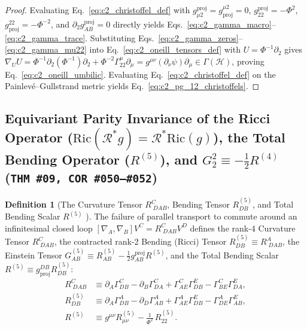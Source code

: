 \documentclass[11pt,a4paper]{article}
\newcommand{\catD}{\text{\textbf{\textcolor{blue!75!black}{[D]}}}}
\theoremstyle{definition}
\newtheorem{definition}[axiom]{Definition}
\theoremstyle{plain}
\theoremstyle{remark}
\begin{document}
\begin{proof}
Evaluating Eq.~\eqref{eq:c2_christoffel_def} with $g_{\mu 2}^{\mathrm{proj}} = g^{\mu 2}_{\mathrm{proj}} = 0$, $g_{22}^{\mathrm{proj}} = -\Phi^2$, $g^{22}_{\mathrm{proj}} = -\Phi^{-2}$, and $\partial_2 g_{AB}^{\mathrm{proj}} = 0$ directly yields Eqs.~\eqref{eq:c2_gamma_macro}--\eqref{eq:c2_gamma_trace}. Substituting Eqs.~\eqref{eq:c2_gamma_zeros}--\eqref{eq:c2_gamma_mu22} into Eq.~\eqref{eq:c2_oneill_tensors_def} with $U = \Phi^{-1}\partial_2$ gives $\nabla_U U = \Phi^{-1}\partial_2(\Phi^{-1})\partial_2 + \Phi^{-2}\Gamma^\mu_{22}\partial_\mu = g^{\mu\nu}(\partial_\nu\psi)\partial_\mu \in \Gamma(\mathcal{H})$, proving Eq.~\eqref{eq:c2_oneill_umbilic}. Evaluating Eq.~\eqref{eq:c2_christoffel_def} on the Painlev\'e--Gullstrand metric yields Eq.~\eqref{eq:c2_pg_12_christoffels}.
\end{proof}

\subsection{\texorpdfstring{Equivariant Parity Invariance of the Ricci Operator ($\mathrm{Ric}(\mathcal{R}^* g) = \mathcal{R}^*\mathrm{Ric}(g)$), the Total Bending Operator ($R^{(5)}$), and $G^2_2 \equiv -\frac{1}{2}R^{(4)}$ (\texttt{THM~\#09, COR~\#050--\#052})}{Equivariant Parity Invariance of the Ricci Operator, the Total Bending Operator, and G\^2\_2 = -(1/2)R\^(4)}}

\begin{definition}[The Curvature Tensor $R^C_{\;DAB}$, Bending Tensor $R_{DB}^{(5)}$, and Total Bending Scalar $R^{(5)}$ \catD]\label{def:c2_total_bending}
The failure of parallel transport to commute around an infinitesimal closed loop $[\nabla_A, \nabla_B]V^C = R^C_{\;DAB}V^D$ defines the rank-4 Curvature Tensor $R^C_{\;DAB}$, the contracted rank-2 Bending (Ricci) Tensor $R_{DB}^{(5)} \equiv R^A_{\;DAB}$, the Einstein Tensor $G_{AB}^{(5)} \equiv R_{AB}^{(5)} - \frac{1}{2}g_{AB}^{\mathrm{proj}}R^{(5)}$, and the Total Bending Scalar $R^{(5)} \equiv g^{DB}_{\mathrm{proj}}R_{DB}^{(5)}$:
\begin{align}
R^C_{\;DAB} &\equiv \partial_A \Gamma^C_{DB} - \partial_B \Gamma^C_{DA} + \Gamma^C_{AE}\Gamma^E_{DB} - \Gamma^C_{BE}\Gamma^E_{DA}, \label{eq:c2_riemann_def} \\[3pt]
R_{DB}^{(5)} &\equiv \partial_A \Gamma^A_{DB} - \partial_D \Gamma^A_{AB} + \Gamma^A_{AE}\Gamma^E_{DB} - \Gamma^A_{DE}\Gamma^E_{AB}, \label{eq:c2_ricci_tensor_def} \\[3pt]
R^{(5)} &\equiv g^{\mu\nu}R_{\mu\nu}^{(5)} - \frac{1}{\Phi^2}\,R_{22}^{(5)}. \label{eq:c2_ricci_scalar_def}
\end{align}
\end{definition}
\end{document}
